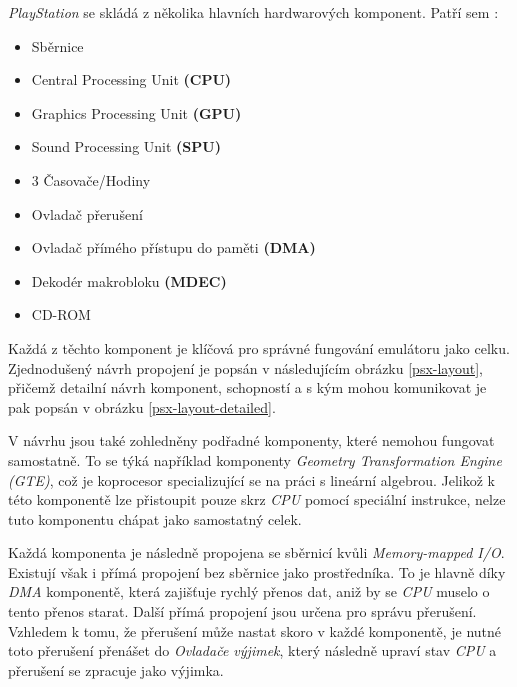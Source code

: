 \textit{PlayStation} se skládá z několika hlavních hardwarových komponent. Patří sem \cite{PSXSpec}:

\begin{itemize}
    \item Sběrnice
    \item Central Processing Unit \textbf{(CPU)}
    \item Graphics Processing Unit \textbf{(GPU)}
    \item Sound Processing Unit \textbf{(SPU)}
    \item 3 Časovače/Hodiny
    \item Ovladač přerušení
    \item Ovladač přímého přístupu do paměti \textbf{(DMA)}
    \item Dekodér makrobloku \textbf{(MDEC)}
    \item CD-ROM
\end{itemize}

Každá z těchto komponent je klíčová pro správné fungování emulátoru jako celku. Zjednodušený návrh propojení je popsán
v následujícím obrázku \ref{psx-layout}, přičemž detailní návrh komponent, schopností a s kým mohou komunikovat je pak popsán v obrázku \ref{psx-layout-detailed}.

V návrhu jsou také zohledněny podřadné komponenty, které nemohou fungovat samostatně.
To se týká například komponenty \textit{Geometry Transformation Engine (GTE)}, což je
koprocesor specializující se na práci s lineární algebrou. Jelikož k této komponentě lze přistoupit
pouze skrz \textit{CPU} pomocí speciální instrukce, nelze tuto komponentu chápat jako samostatný celek.

Každá komponenta je následně propojena se sběrnicí kvůli \textit{Memory-mapped I/O}. Existují
však i přímá propojení bez sběrnice jako prostředníka. To je hlavně díky \textit{DMA} komponentě,
která zajišťuje rychlý přenos dat, aniž by se \textit{CPU} muselo o tento přenos starat. Další
přímá propojení jsou určena pro správu přerušení. Vzhledem k tomu, že přerušení může nastat skoro v
každé komponentě, je nutné toto přerušení přenášet do \textit{Ovladače výjimek}, který následně
upraví stav \textit{CPU} a přerušení se zpracuje jako výjimka.